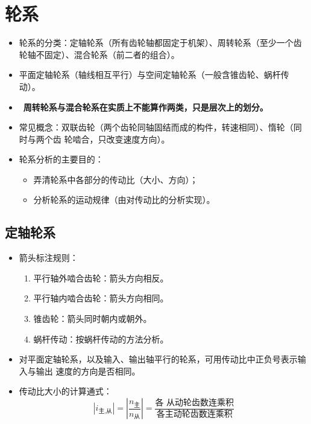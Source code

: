 \documentclass[12pt,a4paper]{article}
\newcommand{\tightlist}{\setlength{\parskip}{0pt}\setlength{\itemsep}{0pt}}
\newcommand{\hint}[1]{\textsf{（#1）}}
\renewcommand{\emph}[1]{\faIcon[regular]{lightbulb}\ \textbf{#1}}
\begin{document}
\section{轮系}
\begin{itemize}\tightlist
    \item 轮系的分类：定轴轮系\hint{所有齿轮轴都固定于机架}、周转轮系\hint{至少一个齿
    轮轴不固定}、混合轮系\hint{前二者的组合}。
    \item 平面定轴轮系\hint{轴线相互平行}与空间定轴轮系\hint{一般含锥齿轮、蜗杆传动}。
    \item \emph{周转轮系与混合轮系在实质上不能算作两类，只是层次上的划分。}
    \item 常见概念：双联齿轮\hint{两个齿轮同轴固结而成的构件，转速相同}、惰轮\hint{同时与两个齿
    轮啮合，只改变速度方向}。
    \item 轮系分析的主要目的：
    \begin{itemize}\tightlist
        \item 弄清轮系中各部分的传动比\hint{大小、方向}；
        \item 分析轮系的运动规律\hint{由对传动比的分析实现}。
    \end{itemize}
\end{itemize}

\subsection{定轴轮系}
\begin{itemize}\tightlist
    \item 箭头标注规则：
    \begin{enumerate}\tightlist
        \item 平行轴外啮合齿轮：箭头方向相反。
        \item 平行轴内啮合齿轮：箭头方向相同。
        \item 锥齿轮：箭头同时朝内或朝外。
        \item 蜗杆传动：按蜗杆传动的方法分析。
    \end{enumerate}
    \item 对平面定轴轮系，以及输入、输出轴平行的轮系，可用传动比中正负号表示输入与输出
    速度的方向是否相同。
    \item 传动比大小的计算通式：
    \begin{equation}
    |i_\text{主,从}|=\left|\frac{n_\text{主}}{n_\text{从}}\right|=\frac{\text{各
    从动轮齿数连乘积}}{\text{各主动轮齿数连乘积}}
    \end{equation}
\end{itemize}
\end{document}

